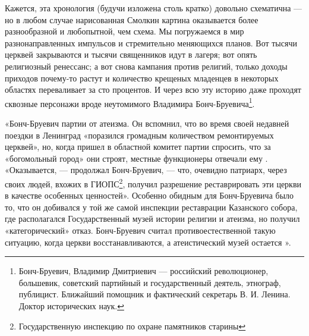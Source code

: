 Кажется, эта хронология (будучи изложена столь кратко) довольно схематична
--- но в любом случае нарисованная Смолкин картина оказывается более
разнообразной и любопытной, чем  схема.
Мы погружаемся в мир разнонаправленных импульсов и стремительно меняющихся планов.
Вот тысячи церквей закрываются и тысячи священников идут в лагеря;
вот опять религиозный ренессанс; а вот снова кампания против религий,
только доходы приходов почему-то растут и количество крещеных младенцев
в некоторых областях переваливает за сто процентов.
И через всю эту историю даже проходят сквозные персонажи
вроде неутомимого Владимира Бонч-Бруевича\footnote{Бонч-Бруевич, Владимир Дмитриевич ---
    российский революционер, большевик, советский партийный и государственный деятель,
    этнограф, публицист. Ближайший помощник и фактический секретарь В. И. Ленина.
    Доктор исторических наук.
}.

«Бонч-Бруевич   партии от атеизма.
Он вспомнил, что во время своей недавней поездки в Ленинград
«поразился громадным количеством ремонтируемых церквей»,
но, когда пришел в областной комитет партии спросить, что за
«богомольный город» они строят, местные функционеры отвечали ему .
«Оказывается, --- продолжал Бонч-Бруевич, --- что, очевидно патриарх, через своих людей,
вхожих в ГИОПС\footnote{Государственную инспекцию по охране памятников старины},
получил разрешение реставрировать эти церкви в качестве особенных ценностей».
Особенно обидным для Бонч-Бруевича было то, что он добивался у той же самой
инспекции реставрации Казанского собора, где располагался
Государственный музей истории религии и атеизма, но получил
«категорический» отказ.
Бонч-Бруевич считал противоестественной такую ситуацию,
когда церкви восстанавливаются, а атеистический музей остается
».

